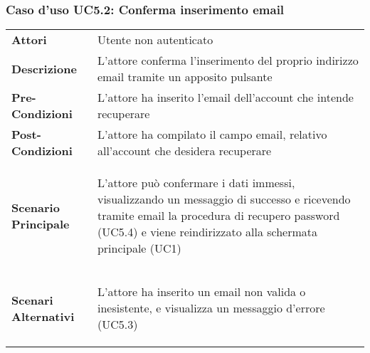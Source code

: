 \subsubsection{Caso d'uso UC5.2: Conferma inserimento email}
\label{UC5_2}

\begin{minipage}{\linewidth}
\begin{longtable}{ l | p{11cm}}
	\hline
	\rowcolor{Gray}
	 \multicolumn{2}{c}{UC5.2 - Conferma inserimento email} \\
	 \hline
	\textbf{Attori} & Utente non autenticato \\
	\textbf{Descrizione} & L'attore conferma l'inserimento del proprio indirizzo email tramite un apposito pulsante \\
	\textbf{Pre-Condizioni} & L'attore ha inserito l'email dell'account che intende recuperare\\
	\textbf{Post-Condizioni} & L'attore ha compilato il campo email, relativo all'account che desidera recuperare\\
	\textbf{Scenario Principale} & \begin{enumerate*}[label=(\arabic*.),itemjoin={\newline}]
		\item L'attore può confermare i dati immessi, visualizzando un messaggio di successo e ricevendo tramite email la procedura di recupero password (UC5.4) e viene reindirizzato alla schermata principale (UC1)
	\end{enumerate*}\\
	\textbf{Scenari Alternativi} & 
	\begin{enumerate*}[label=(\arabic*.),itemjoin={\newline}]
		\item L'attore ha inserito un email non valida o inesistente, e visualizza un messaggio d'errore (UC5.3)
	\end{enumerate*}\\
\end{longtable}
\end{minipage}